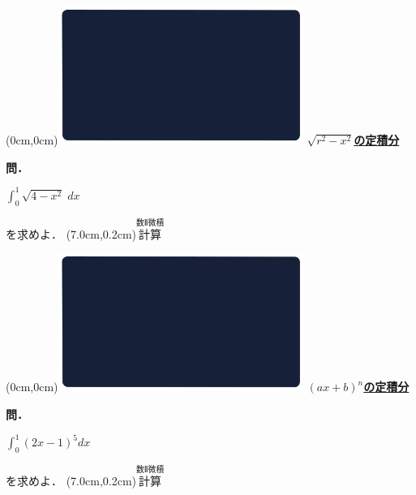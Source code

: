 \documentclass[10pt,
fleqn,
dvipdfmx,
uplatex
]{jsarticle}
\begin{document}
\at(0cm,0cm){\includegraphics[width=8cm,bb=0 0 1920 1080]{./thumbnails/templates/smart_background/数II微積.jpeg}}
{\color{orange}\bf\boldmath\LARGE\underline{$\sqrt {r^2-x^2}$の定積分}}\vspace{0.3zw}

\large
\bf\boldmath 問．

\HUGE 
\vspace{-0.2zw}
\hspace{0.5zw}$\displaystyle\int_0^1\sqrt {4-x^2}\;dx$
\vspace{-1zw}

\large
\hfill 
を求めよ．
\at(7.0cm,0.2cm){\small\color{bradorange}$\overset{\text{数Ⅱ微積}}{\text{計算}}$}


\newpage



\at(0cm,0cm){\includegraphics[width=8cm,bb=0 0 1920 1080]{./thumbnails/templates/smart_background/数II微積.jpeg}}
{\color{orange}\bf\boldmath\LARGE\underline{$\left(ax+b\right)^n$の定積分}}\vspace{0.3zw}

\large 
\bf\boldmath 問．

\HUGE 
\vspace{-0.2zw}
\hspace{0.5zw}$\displaystyle\int_0^1\left(2x-1\right)^5dx$
\vspace{-1zw}

\large 
\hfill を求めよ．
\at(7.0cm,0.2cm){\small\color{bradorange}$\overset{\text{数Ⅱ微積}}{\text{計算}}$}


\newpage
\end{document}
